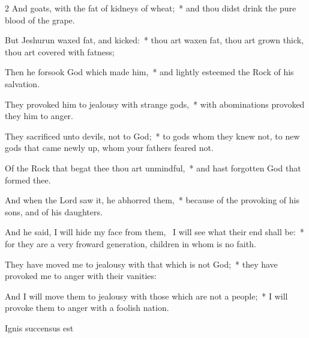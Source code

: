 \begin{multicols}{2}
And goats, with the fat of kidneys of wheat;~* and thou didst drink the pure blood of the grape.\par
But Jeshurun waxed fat, and kicked:~* thou art waxen fat, thou art grown thick, thou art covered with fatness;\par
Then he forsook God which made him,~* and lightly esteemed the Rock of his salvation.\par
They provoked him to jealousy with strange gods,~* with abominations provoked they him to anger.\par
They sacrificed unto devils, not to God;~* to gods whom they knew not, to new gods that came newly up, whom your fathers feared not.\par
Of the Rock that begat thee thou art unmindful,~* and hast forgotten God that formed thee.\par
And when the Lord saw it, he abhorred them,~* because of the provoking of his sons, and of his daughters.\par
And he said, I will hide my face from them,~{\dag} I will see what their end shall be:~* for they are a very froward generation, children in whom is no faith.\par
They have moved me to jealousy with that which is not God;~* they have provoked me to anger with their vanities:\par
And I will move them to jealousy with those which are not a people;~* I will provoke them to anger with a foolish nation.

\begin{inhead}
Ignis succensus est
\end{inhead}


\end{multicols}
